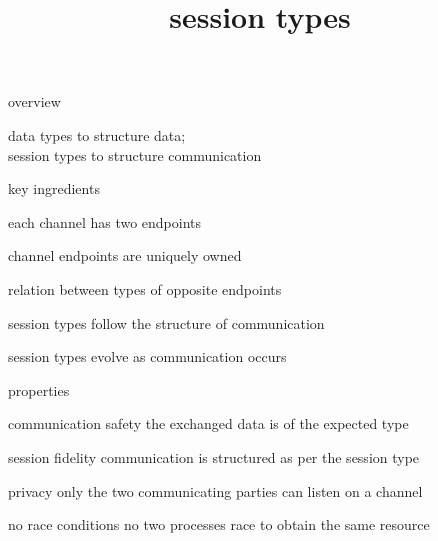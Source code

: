 \documentclass[dvipsnames]{beamer}
\date{}
\title{session types}
\begin{document}
  \maketitle

  \begin{frame}{overview}
    \begin{center}
      data types to structure data;\\
      session types to structure communication
    \end{center}
  \end{frame}

  \begin{frame}{key ingredients}
    \begin{description}
      \setlength\itemsep{1em}
    \item[endpoints] each channel has two endpoints
    \item[linearity] channel endpoints are uniquely owned
    \item[duality] relation between types of opposite endpoints
    \item[structure] session types follow the structure of communication
    \item[change] session types evolve as communication occurs
    \end{description}
  \end{frame}

  \begin{frame}{properties}
    \begin{block}{communication safety}
      the exchanged data is of the expected type
    \end{block}
    \begin{block}{session fidelity}
      communication is structured as per the session type
    \end{block}
    \begin{block}{privacy}
      only the two communicating parties can listen on a channel
    \end{block}
    \begin{block}{no race conditions}
      no two processes race to obtain the same resource
    \end{block}
  \end{frame}
\end{document}
